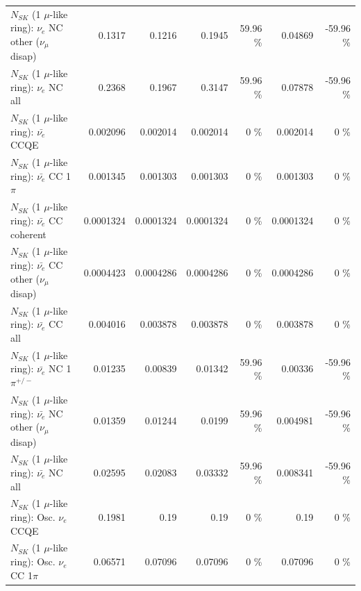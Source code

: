 \begin{table}
\begin{tabular}{| l | r | r | r  r | r  r |}
                $N_{SK}$ (1 $\mu$-like ring): $\nu_e$ NC other ($\nu_\mu$ disap) &          0.1317 &          0.1216 &          0.1945 &    59.96 \%  &         0.04869 &   -59.96 \%  \\ 
                                  $N_{SK}$ (1 $\mu$-like ring): $\nu_{e}$ NC all &          0.2368 &          0.1967 &          0.3147 &    59.96 \%  &         0.07878 &   -59.96 \%  \\ 
\hline
\hline
\hline
                                $N_{SK}$ (1 $\mu$-like ring): $\bar{\nu_e}$ CCQE &        0.002096 &        0.002014 &        0.002014 &        0 \%  &        0.002014 &        0 \%  \\ 
                           $N_{SK}$ (1 $\mu$-like ring): $\bar{\nu_e}$ CC 1$\pi$ &        0.001345 &        0.001303 &        0.001303 &        0 \%  &        0.001303 &        0 \%  \\ 
                         $N_{SK}$ (1 $\mu$-like ring): $\bar{\nu_e}$ CC coherent &       0.0001324 &       0.0001324 &       0.0001324 &        0 \%  &       0.0001324 &        0 \%  \\ 
          $N_{SK}$ (1 $\mu$-like ring): $\bar{\nu_e}$ CC other ($\nu_\mu$ disap) &       0.0004423 &       0.0004286 &       0.0004286 &        0 \%  &       0.0004286 &        0 \%  \\ 
                            $N_{SK}$ (1 $\mu$-like ring): $\bar{\nu_{e}}$ CC all &        0.004016 &        0.003878 &        0.003878 &        0 \%  &        0.003878 &        0 \%  \\ 
\hline
                     $N_{SK}$ (1 $\mu$-like ring): $\bar{\nu_e}$ NC 1$\pi^{+/-}$ &         0.01235 &         0.00839 &         0.01342 &    59.96 \%  &         0.00336 &   -59.96 \%  \\ 
          $N_{SK}$ (1 $\mu$-like ring): $\bar{\nu_e}$ NC other ($\nu_\mu$ disap) &         0.01359 &         0.01244 &          0.0199 &    59.96 \%  &        0.004981 &   -59.96 \%  \\ 
                            $N_{SK}$ (1 $\mu$-like ring): $\bar{\nu_{e}}$ NC all &         0.02595 &         0.02083 &         0.03332 &    59.96 \%  &        0.008341 &   -59.96 \%  \\ 
\hline
\hline
\hline
                                 $N_{SK}$ (1 $\mu$-like ring): Osc. $\nu_e$ CCQE &          0.1981 &            0.19 &            0.19 &        0 \%  &            0.19 &        0 \%  \\ 
                            $N_{SK}$ (1 $\mu$-like ring): Osc. $\nu_e$ CC 1$\pi$ &         0.06571 &         0.07096 &         0.07096 &        0 \%  &         0.07096 &        0 \%  \\ 

\end{tabular}
\end{table}
